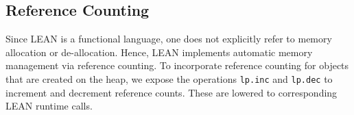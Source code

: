 \documentclass[conference]{IEEEtran}
\newcommand{\lpinc}{\textcolor{pairedTwoDarkBlue}{\texttt{lp.inc}}}
\newcommand{\lpdec}{\textcolor{pairedTwoDarkBlue}{\texttt{lp.dec}}}
\begin{document}
\subsection{Reference Counting}

Since LEAN is a functional language, one does not explicitly refer to memory allocation
or de-allocation. Hence, LEAN implements automatic memory management
via reference counting. To incorporate reference counting for objects that
are created on the heap, we expose the operations \lpinc{} and
\lpdec{} to increment and decrement reference counts. These are lowered
to corresponding LEAN runtime calls.





\end{document}
